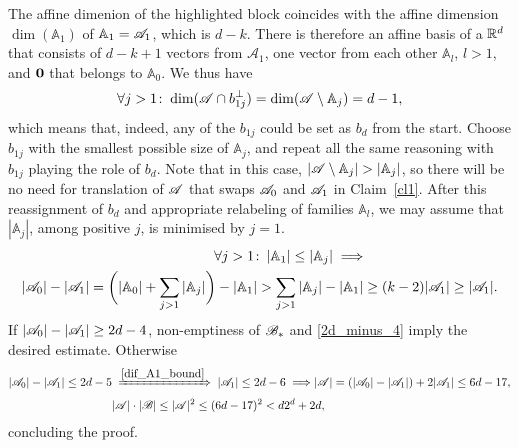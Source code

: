 \begin{enumerate}
            The affine dimenion of the highlighted block coincides with the affine dimension $\dim(\mathbb A_1)$ of $\mathbb{A}_1={\mathscr{A}}_1$, which is $d-k$. There is therefore an affine basis of a ${\mathbb{R}}^d$ that consists of $d-k+1$ vectors from $\mathcal{A}_1$, one vector from each other $\mathbb{A}_l$, $l>1$, and  $\mathbf{0}$ that belongs to $\mathbb{A}_0$. %
            We thus have
            \begin{equation*}
                \forall j>1\!:\;\operatorname{dim}({\mathscr{A}}\cap b_{1j}^\bot) = \operatorname{dim}({\mathscr{A}}\setminus\mathbb{A}_j) = d-1,
            \end{equation*}  
            which means that, indeed, any of the $b_{1j}$ could be set as $b_d$ from the start. Choose $b_{1j}$ with the smallest possible size of $\mathbb{A}_j$, and repeat all the same reasoning with $b_{1j}$ playing the role of $b_d$. Note that in this case, $\left|\aaa\setminus\mathbb{A}_j\right|>\left|\mathbb{A}_j\right|$, so there will be no need for translation of ${\mathscr{A}}$ that swaps ${\mathscr{A}}_0$ and ${\mathscr{A}}_1$ in Claim~\ref{cl1}. After this reassignment of $b_d$ and appropriate relabeling of families $\mathbb{A}_l$, we may  assume that $|\mathbb{A}_j|$, among positive $j$, is minimised by $j=1$.
            \begin{align}
                \forall j>1\!:\:|\mathbb{A}_1| \leq |\mathbb{A}_j|\; \Longrightarrow & \nonumber\\   |{\mathscr{A}}_0|-|{\mathscr{A}}_1| = \biggl(|\mathbb{A}_0|+\sum_{j>1}|\mathbb{A}_j|\biggr) - |\mathbb{A}_1| > \sum_{j>1}|\mathbb{A}_j| - |\mathbb{A}_1| & \geq(k-2)|{\mathscr{A}}_1| \geq |{\mathscr{A}}_1|.\label{dif_A1_bound}
            \end{align} 
            If $\left|{\mathscr{A}}_0\right|-\left|{\mathscr{A}}_1\right|\geq2d-4$, non-emptiness of ${\mathscr{B}}_*$ and \eqref{2d_minus_4} imply the desired estimate. Otherwise
            \begin{align*}
                |{\mathscr{A}}_0|-|{\mathscr{A}}_1| \leq 2d-5 & \;\xRightarrow{\eqref{dif_A1_bound}}\; |{\mathscr{A}}_1| \leq 2d - 6\;\Longrightarrow |{\mathscr{A}}| = (|{\mathscr{A}}_0|-|{\mathscr{A}}_1|) + 2|{\mathscr{A}}_1| \leq 6d-17, \\
                &|{\mathscr{A}}|\cdot|{\mathscr{B}}| \leq |{\mathscr{A}}|^2 \leq (6d-17)^2 < d 2^d + 2d,
            \end{align*}
            concluding the proof.
        \end{enumerate}

